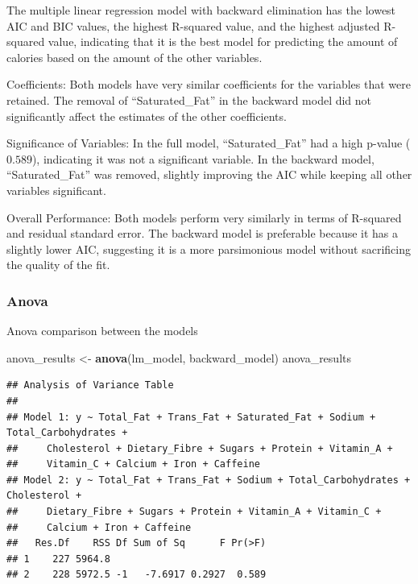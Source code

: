 \documentclass[
]{article}
\newenvironment{Shaded}{\begin{snugshade}}{\end{snugshade}}
\newcommand{\FunctionTok}[1]{\textcolor[rgb]{0.13,0.29,0.53}{\textbf{#1}}}
\newcommand{\NormalTok}[1]{#1}
\newcommand{\OtherTok}[1]{\textcolor[rgb]{0.56,0.35,0.01}{#1}}
\begin{document}
The multiple linear regression model with backward elimination has the
lowest AIC and BIC values, the highest R-squared value, and the highest
adjusted R-squared value, indicating that it is the best model for
predicting the amount of calories based on the amount of the other
variables.

Coefficients: Both models have very similar coefficients for the
variables that were retained. The removal of ``Saturated\_Fat'' in the
backward model did not significantly affect the estimates of the other
coefficients.

Significance of Variables: In the full model, ``Saturated\_Fat'' had a
high p-value (\(0.589\)), indicating it was not a significant variable.
In the backward model, ``Saturated\_Fat'' was removed, slightly
improving the AIC while keeping all other variables significant.

Overall Performance: Both models perform very similarly in terms of
R-squared and residual standard error. The backward model is preferable
because it has a slightly lower AIC, suggesting it is a more
parsimonious model without sacrificing the quality of the fit.

\subsubsection{Anova}\label{anova}

Anova comparison between the models

\begin{Shaded}
\begin{Highlighting}[]
\NormalTok{anova\_results }\OtherTok{\textless{}{-}} \FunctionTok{anova}\NormalTok{(lm\_model, backward\_model)}
\NormalTok{anova\_results}
\end{Highlighting}
\end{Shaded}

\begin{verbatim}
## Analysis of Variance Table
## 
## Model 1: y ~ Total_Fat + Trans_Fat + Saturated_Fat + Sodium + Total_Carbohydrates + 
##     Cholesterol + Dietary_Fibre + Sugars + Protein + Vitamin_A + 
##     Vitamin_C + Calcium + Iron + Caffeine
## Model 2: y ~ Total_Fat + Trans_Fat + Sodium + Total_Carbohydrates + Cholesterol + 
##     Dietary_Fibre + Sugars + Protein + Vitamin_A + Vitamin_C + 
##     Calcium + Iron + Caffeine
##   Res.Df    RSS Df Sum of Sq      F Pr(>F)
## 1    227 5964.8                           
## 2    228 5972.5 -1   -7.6917 0.2927  0.589
\end{verbatim}
\end{document}
